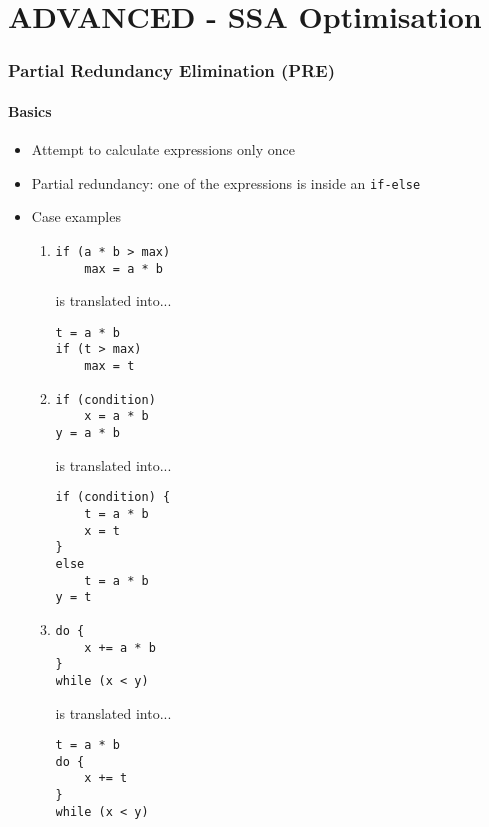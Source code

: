 \documentclass[a4paper,12pt, notitlepage]{article}
\begin{document}
\section*{ADVANCED - SSA Optimisation}
\subsubsection*{Partial Redundancy Elimination (PRE)}
\paragraph*{Basics}
\begin{itemize}
\item Attempt to calculate expressions only once
\item Partial redundancy: one of the expressions is inside an \texttt{if-else}
\item Case examples
    \begin{enumerate}
        \item 
        \begin{verbatim}
if (a * b > max)
    max = a * b
        \end{verbatim} \vspace{-0.5cm}
        is translated into...
        \begin{verbatim}
t = a * b
if (t > max)
    max = t
        \end{verbatim} \vspace{-0.5cm}
        \item 
        \begin{verbatim}
if (condition)
    x = a * b
y = a * b
        \end{verbatim} \vspace{-0.5cm}
        is translated into...
        \begin{verbatim}
if (condition) {
    t = a * b
    x = t
}
else
    t = a * b
y = t
        \end{verbatim} \vspace{-0.5cm}
        \item 
        \begin{verbatim}
do {
    x += a * b
}
while (x < y)
        \end{verbatim} \vspace{-0.5cm}
        is translated into...
        \begin{verbatim}
t = a * b
do {
    x += t
}
while (x < y)
        \end{verbatim} \vspace{-0.5cm}
        \pagebreak

\end{enumerate}
\end{itemize}
\end{document}

